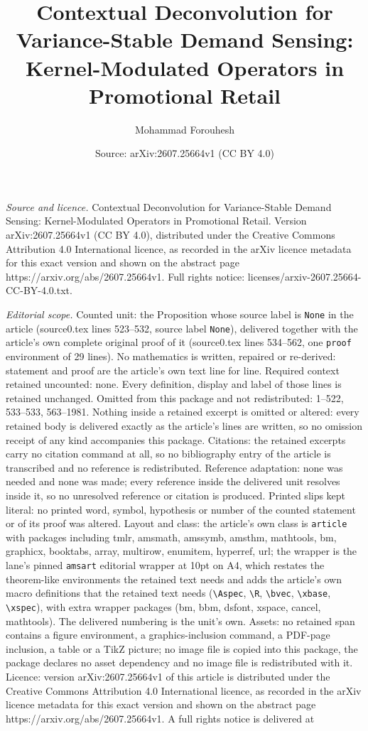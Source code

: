 \documentclass[10pt,a4paper]{amsart}
\title[Contextual Deconvolution for Variance-Stable Demand Sensing:]{Contextual Deconvolution for Variance-Stable Demand Sensing: Kernel-Modulated Operators in Promotional Retail}
\author{Mohammad Forouhesh}
\date{Source: arXiv:2607.25664v1 (CC BY 4.0)}
\begin{document}
\maketitle

\noindent\emph{Source and licence.} Contextual Deconvolution for Variance-Stable Demand Sensing: Kernel-Modulated Operators in Promotional Retail. Version arXiv:2607.25664v1 (CC BY 4.0), distributed under the Creative Commons Attribution 4.0 International licence, as recorded in the arXiv licence metadata for this exact version and shown on the abstract page https://arxiv.org/abs/2607.25664v1. Full rights notice: licenses/arxiv-2607.25664-CC-BY-4.0.txt.\par\smallskip

\noindent\textit{Editorial scope.} Counted unit: the Proposition whose source label is \texttt{None} in the article (source0.tex lines 523--532, source label \texttt{None}), delivered together with the article's own complete original proof of it (source0.tex lines 534--562, one \texttt{proof} environment of 29 lines). No mathematics is written, repaired or re-derived: statement and proof are the article's own text line for line. Required context retained uncounted: none. Every definition, display and label of those lines is retained unchanged. Omitted from this package and not redistributed: 1--522, 533--533, 563--1981. Nothing inside a retained excerpt is omitted or altered: every retained body is delivered exactly as the article's lines are written, so no omission receipt of any kind accompanies this package. Citations: the retained excerpts carry no citation command at all, so no bibliography entry of the article is transcribed and no reference is redistributed. Reference adaptation: none was needed and none was made; every reference inside the delivered unit resolves inside it, so no unresolved reference or citation is produced. Printed slips kept literal: no printed word, symbol, hypothesis or number of the counted statement or of its proof was altered. Layout and class: the article's own class is \texttt{article} with packages including tmlr, amsmath, amssymb, amsthm, mathtools, bm, graphicx, booktabs, array, multirow, enumitem, hyperref, url; the wrapper is the lane's pinned \texttt{amsart} editorial wrapper at 10pt on A4, which restates the theorem-like environments the retained text needs and adds the article's own macro definitions that the retained text needs (\texttt{\textbackslash Aspec}, \texttt{\textbackslash R}, \texttt{\textbackslash bvec}, \texttt{\textbackslash xbase}, \texttt{\textbackslash xspec}), with extra wrapper packages (bm, bbm, dsfont, xspace, cancel, mathtools). The delivered numbering is the unit's own. Assets: no retained span contains a figure environment, a graphics-inclusion command, a PDF-page inclusion, a table or a TikZ picture; no image file is copied into this package, the package declares no asset dependency and no image file is redistributed with it. Licence: version arXiv:2607.25664v1 of this article is distributed under the Creative Commons Attribution 4.0 International licence, as recorded in the arXiv licence metadata for this exact version and shown on the abstract page https://arxiv.org/abs/2607.25664v1. A full rights notice is delivered at 
\end{document}
